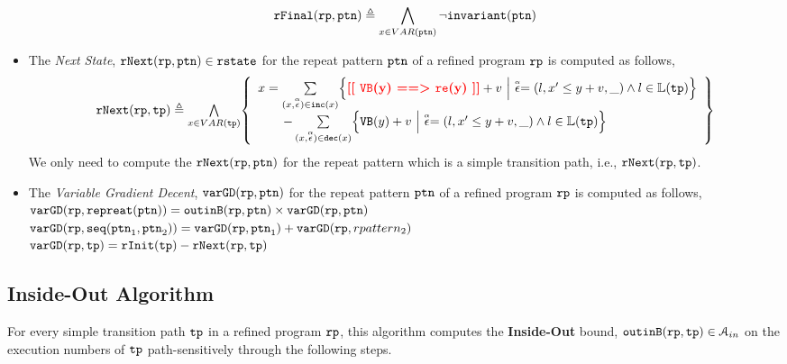 \begin{itemize}
\[
  \mathtt{rFinal}(\mathtt{rp}, \mathtt{ptn}) \triangleq 
  \bigwedge_{x \in VAR(\mathtt{ptn})}
  \neg \mathtt{invariant}(\mathtt{ptn})
  \]
\item The \emph{Next State}, $\mathtt{rNext}(\mathtt{rp}, \mathtt{ptn}) \in \mathtt{rstate}$ for the repeat pattern $\mathtt{ptn}$ of a refined program $\mathtt{rp}$ is computed as follows,
%
\[
  \begin{array}{l}
  \rfnext(\rprog, \tpath) \triangleq 
  \bigwedge\limits_{x \in VAR(\tpath)}
  \left\{ 
    \begin{array}{l}
  x =   \sum\limits_{(x, \absevent) \in \inc(x) }
  \left\{ 
    \todo{\varinvar(y) ==> \reset(y)}+ v ~\middle\vert~ \absevent = (l, x' \leq y + v, \_) \land l \in \lvar(\tpath)\right\}
    \\ \qquad 
    - \sum\limits_{(x, \absevent) \in \dec(x) }\left\{ 
      \varinvar(y) + v ~\middle\vert~ \absevent = (l, x' \leq y + v, \_) \land l \in \lvar(\tpath) \right\}
    \end{array}
  \right\}
  \end{array}
\]
We only need to compute the $\mathtt{rNext}(\mathtt{rp}, \mathtt{ptn})$ for the repeat pattern which is a simple transition path,
i.e., $\mathtt{rNext}(\mathtt{rp}, \mathtt{tp})$.
\item  The \emph{Variable Gradient Decent}, $\mathtt{varGD}(\mathtt{rp}, \mathtt{ptn})$ for the repeat pattern $\mathtt{ptn}$ of a refined program $\mathtt{rp}$ is computed as follows,
\\
{$\mathtt{varGD}(\mathtt{rp}, \mathtt{repreat}(\mathtt{ptn})) =  \mathtt{outinB}(\mathtt{rp}, \mathtt{ptn}) \times {\ensuremath{\mathtt{varGD}}(\ensuremath{\mathtt{rp}}, \ensuremath{\mathtt{ptn}})}$}
\\
$\mathtt{varGD}(\mathtt{rp}, \mathtt{seq}(\mathtt{ptn}_1, \mathtt{ptn}_2)) =  \mathtt{varGD}(\mathtt{rp}, \mathtt{ptn}_1)+ \mathtt{varGD}(\mathtt{rp}, rpattern_2)$
\\
$\mathtt{varGD}(\mathtt{rp}, \mathtt{tp}) =  \mathtt{rInit}(\mathtt{tp}) - \mathtt{rNext}(\mathtt{rp}, \mathtt{tp})$
\end{itemize}
%
\subsection{Inside-Out Algorithm}
\label{sec:pathsensitive_rb-inoutalg}
For every simple transition path $\mathtt{tp}$ in a refined program $\mathtt{rp}$, 
this algorithm
computes the \textbf{Inside-Out} bound, $\mathtt{outinB}(\mathtt{rp}, \mathtt{tp}) \in \mathcal{A}_{in}$
on the execution numbers of $\mathtt{tp}$ path-sensitively
through the following steps.

